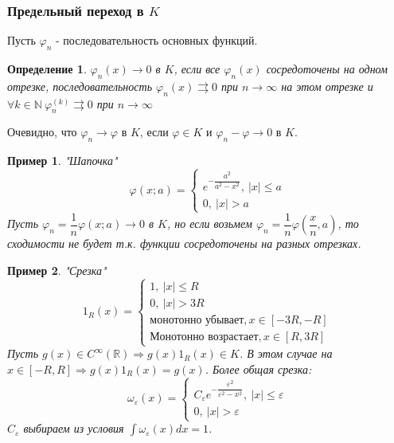 \documentclass[9pt, a4paper]{article}
\newtheorem*{definition}{Определение}
\newtheorem*{sample}{Пример}
\begin{document}
		\subsubsection*{Предельный переход в $K$}
			Пусть $\varphi_n$ - последовательность основных функций.
			\begin{definition}
				$\varphi_n(x) \to 0$ в $K$, если все $\varphi_n(x)$ сосредоточены на одном отрезке, последовательность $\varphi_n(x) \rightrightarrows 0$ при $n \to \infty$ на этом отрезке и $\forall k \in \mathbb{N}\ \varphi_n^{(k)} \rightrightarrows 0$ при $n \to \infty$  
			\end{definition}
			Очевидно, что $\varphi_n \to \varphi$ в $K$, если $ \varphi \in K$ и  $\varphi_n - \varphi \to 0$ в $K$.
			\begin{sample}
				"Шапочка"\newline
				\begin{equation*}
					\varphi(x; a) = \begin{cases}
						e^{-\dfrac{a^2}{a^2 - x^2}}, \ |x| \leq a \\
						0, \ |x| > a
					\end{cases}
				\end{equation*}
				Пусть $\varphi_n = \dfrac1{n} \varphi(x;a) \to 0 $ в $K$, но если возьмем $\varphi_n = \dfrac{1}{n} \varphi(\dfrac{x}{n}, a)$, то сходимости не будет т.к. функции сосредоточены на разных отрезках.
			\end{sample}
			\begin{sample}
				"Срезка"\newline
				\begin{equation*}
					1_R(x) = \begin{cases}
						1, \ |x| \leq R\\
						0, \ |x| > 3R \\
						\text{монотонно убывает}, x \in [-3R, -R] \\
						\text{Монотонно возрастает}, x \in [R, 3R]
					\end{cases}
				\end{equation*}
				Пусть $g(x) \in C^\infty(\mathbb{R}) \Rightarrow g(x)1_R(x) \in K$. В этом случае на $x \in [-R, R] \Rightarrow g(x)1_R(x) = g(x)$.\newline
				Более общая срезка:
				\begin{equation*}
					\omega_\varepsilon(x) = \begin{cases}
						C_\varepsilon e^{-\dfrac{\varepsilon^2}{\varepsilon^2 - x^2}}, \ |x| \leq \varepsilon \\
						0, \ |x| > \varepsilon
					\end{cases}
				\end{equation*}
				$C_\varepsilon$ выбираем из условия $\int \omega_\varepsilon(x) dx = 1$.
			\end{sample}
\end{document}
